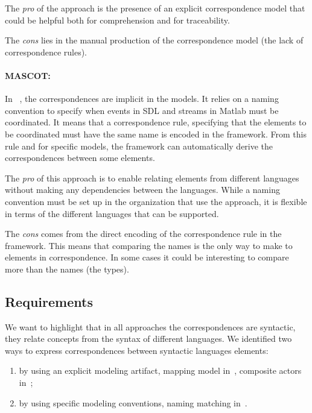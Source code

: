 The \emph{pro} of the approach is the presence of an explicit correspondence model that could be helpful both for comprehension and for traceability.

The \emph{cons} lies in the manual production of the correspondence model (\ie the lack of correspondence rules).



\paragraph{MASCOT: }
In ~\cite{mascotbib}, the correspondences are implicit in the models. It relies on a naming convention to specify when events in SDL and streams in Matlab must be coordinated. It means that a correspondence rule, specifying that the elements to be coordinated must have the same name is encoded in the framework. From this rule and for specific models, the framework can automatically derive the correspondences between some elements.

The \emph{pro} of this approach is to enable relating elements from different languages without making any dependencies between the languages. While a naming convention must be set up in the organization that use the approach, it is flexible in terms of the different languages that can be supported.

The \emph{cons} comes from the direct encoding of the correspondence rule in the framework. This means that comparing the names is the only way to make to elements in correspondence. In some cases it could be interesting to compare more than the names (\eg the types).

\subsection{Requirements}

We want to highlight that in all approaches the correspondences are syntactic, \ie they relate concepts from the syntax of different languages. We identified two ways to express correspondences between syntactic languages elements:
\begin{enumerate}
 \item by using an explicit modeling artifact, \eg mapping model in~\cite{dinatale}, composite actors in~\cite{modhelxbib, ptoleframebib}; 	
  \item by using specific modeling conventions, \eg naming matching in~\cite{mascotbib}.
\end{enumerate}
				
